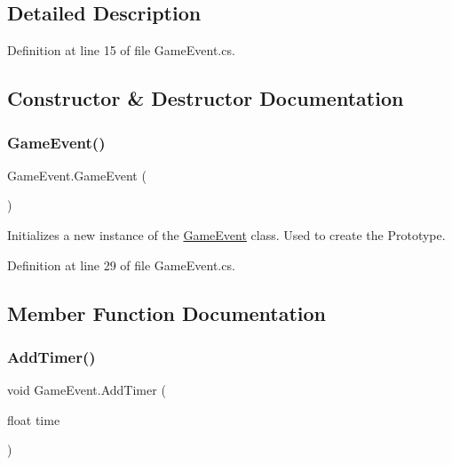 \subsection{Detailed Description}


Definition at line 15 of file Game\+Event.\+cs.



\subsection{Constructor \& Destructor Documentation}
\mbox{\label{class_game_event_a575221b54e41817d77dfdd0bd2a8427c}} 
\subsubsection{\texorpdfstring{Game\+Event()}{GameEvent()}}
{\footnotesize\ttfamily Game\+Event.\+Game\+Event (\begin{DoxyParamCaption}{ }\end{DoxyParamCaption})}



Initializes a new instance of the \hyperlink{class_game_event}{Game\+Event} class. Used to create the Prototype. 



Definition at line 29 of file Game\+Event.\+cs.



\subsection{Member Function Documentation}
\mbox{\label{class_game_event_a9dfc62e4b1595e95238c7e69973f9eb7}} 
\subsubsection{\texorpdfstring{Add\+Timer()}{AddTimer()}}
{\footnotesize\ttfamily void Game\+Event.\+Add\+Timer (\begin{DoxyParamCaption}\item[{float}]{time }\end{DoxyParamCaption})}



